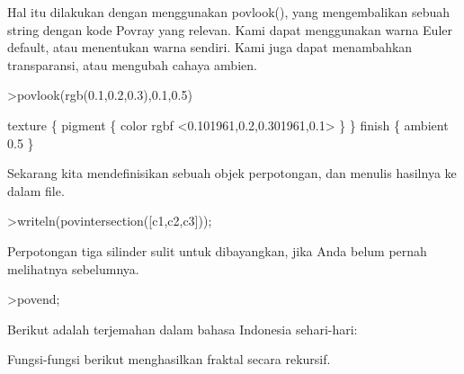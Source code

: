 \documentclass[a4paper,10pt]{article}
\begin{document}
\begin{eulernotebook}
\begin{eulercomment}
\begin{eulercomment}
\begin{eulercomment}
Hal itu dilakukan dengan menggunakan povlook(), yang mengembalikan
sebuah string dengan kode Povray yang relevan. Kami dapat menggunakan
warna Euler default, atau menentukan warna sendiri. Kami juga dapat
menambahkan transparansi, atau mengubah cahaya ambien.
\end{eulercomment}
\begin{eulerprompt}
>povlook(rgb(0.1,0.2,0.3),0.1,0.5)
\end{eulerprompt}
\begin{euleroutput}
   texture \{ pigment \{ color rgbf <0.101961,0.2,0.301961,0.1> \}  \} 
   finish \{ ambient 0.5 \} 
  
\end{euleroutput}
\begin{eulercomment}
Sekarang kita mendefinisikan sebuah objek perpotongan, dan menulis
hasilnya ke dalam file.
\end{eulercomment}
\begin{eulerprompt}
>writeln(povintersection([c1,c2,c3]));
\end{eulerprompt}
\begin{eulercomment}
Perpotongan tiga silinder sulit untuk dibayangkan, jika Anda belum
pernah melihatnya sebelumnya.
\end{eulercomment}
\begin{eulerprompt}
>povend;
\end{eulerprompt}
\begin{eulercomment}
Berikut adalah terjemahan dalam bahasa Indonesia sehari-hari:

Fungsi-fungsi berikut menghasilkan fraktal secara rekursif.


\end{eulercomment}
\end{eulercomment}
\end{eulercomment}
\end{eulernotebook}
\end{document}

